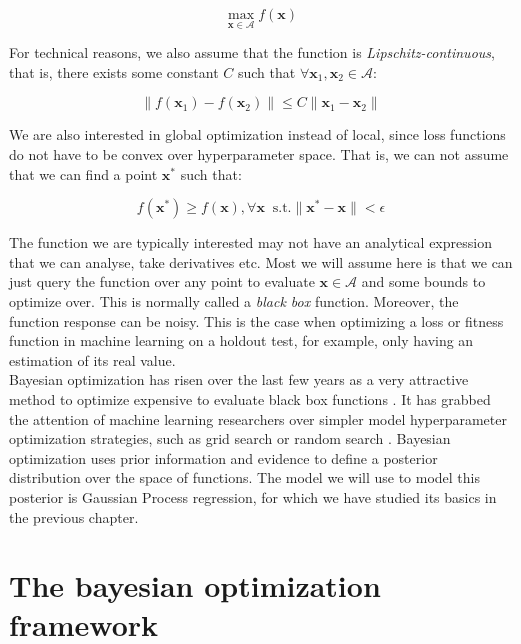 \documentclass[10pt,a4paper,twoside]{book}
\begin{document}
\begin{equation}
\max_{\boldsymbol{x}\in \mathcal{A}} f(\boldsymbol{x})
\end{equation}

For technical reasons, we also assume that the function is \textit{Lipschitz-continuous}, that is, there exists some constant $C$ such that $\forall \boldsymbol{x}_1, \boldsymbol{x}_2 \in \mathcal{A}$:

\begin{equation}
\lVert f(\boldsymbol{x}_1) - f(\boldsymbol{x}_2) \rVert \leq C \lVert \boldsymbol{x}_1  - \boldsymbol{x}_2\rVert
\end{equation}

We are also interested in global optimization instead of local, since loss functions do not have to be convex over hyperparameter space. That is, we can not assume that we can find a point $\boldsymbol{x^{*}}$ such that:

\begin{equation}
f(\boldsymbol{x}^*) \geq f(\boldsymbol{x}), \forall \boldsymbol{x}\;\; \mathrm{s.t.} \rVert \boldsymbol{x}^* - \boldsymbol{x} \lVert < \epsilon
\end{equation}

The function we are typically interested may not have an analytical expression that we can analyse, take derivatives etc. Most we will assume here is that we can just query the function over any point to evaluate $\boldsymbol{x}\in\mathcal{A}$ and some bounds to optimize over. This is normally called a \textit{black box} function. Moreover, the function response can be noisy. This is the case when optimizing a loss or fitness function in machine learning on a holdout test, for example, only having an estimation of its real value.\\ 

Bayesian optimization has risen over the last few years as a very attractive method to optimize expensive to evaluate black box functions \cite{Shahriari2016, Brochu2010}. It has grabbed the attention of machine learning researchers over simpler model hyperparameter optimization strategies, such as grid search or random search \cite{Bergstra2012}. Bayesian optimization uses prior information and evidence to define a posterior distribution over the space of functions. The model we will use to model this posterior is Gaussian Process regression, for which we have studied its basics in the previous chapter.


\section{The bayesian optimization framework}
\end{document}
